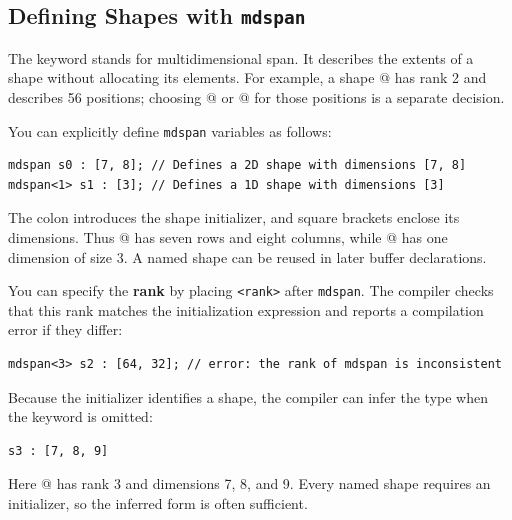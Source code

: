 \subsection*{Defining Shapes with \texttt{mdspan}}

The keyword \co@mdspan@ stands for multidimensional span. It describes the extents of a shape without allocating its elements. For example, a shape \co@[7, 8]@ has rank 2 and describes 56 positions; choosing @ or @ for those positions is a separate decision.

You can explicitly define \texttt{mdspan} variables as follows:

\begin{lstlisting}[language=croqtile,caption={Declaring a shape}]
mdspan s0 : [7, 8]; // Defines a 2D shape with dimensions [7, 8]
mdspan<1> s1 : [3]; // Defines a 1D shape with dimensions [3]
\end{lstlisting}

The colon introduces the shape initializer, and square brackets enclose its dimensions. Thus @ has seven rows and eight columns, while @ has one dimension of size 3. A named shape can be reused in later buffer declarations.

You can specify the \textbf{rank} by placing \texttt{\textless{}rank\textgreater{}} after \texttt{mdspan}. The compiler checks that this rank matches the initialization expression and reports a compilation error if they differ:

\begin{lstlisting}[language=croqtile,caption={A rank mismatch}]
mdspan<3> s2 : [64, 32]; // error: the rank of mdspan is inconsistent
\end{lstlisting}

Because the initializer identifies a shape, the compiler can infer the \co@mdspan@ type when the keyword is omitted:

\begin{lstlisting}[language=croqtile,caption={Omitting the mdspan keyword}]
s3 : [7, 8, 9]
\end{lstlisting}

Here @ has rank 3 and dimensions 7, 8, and 9. Every named shape requires an initializer, so the inferred form is often sufficient.
